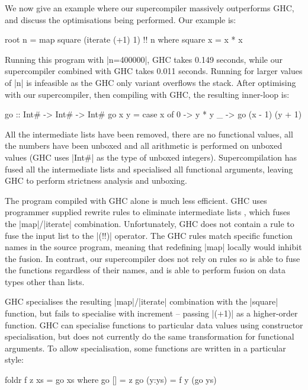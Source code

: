 \documentclass[draft]{sigplanconf}
\begin{document}
We now give an example where our supercompiler massively outperforms GHC, and discuss the optimisations being performed. Our example is:

\begin{code}
root n = map square (iterate (+1) 1) !! n
    where square x = x * x
\end{code}

Running this program with |n=400000|, GHC takes 0.149 seconds, while our supercompiler combined with GHC takes 0.011 seconds. Running for larger values of |n| is infeasible as the GHC only variant overflows the stack. After optimising with our supercompiler, then compiling with GHC, the resulting inner-loop is:

\begin{code}
go :: Int# -> Int# -> Int#
go x y = case x of
    0 -> y * y
    _ -> go (x - 1) (y + 1)
\end{code}

All the intermediate lists have been removed, there are no functional values, all the numbers have been unboxed and all arithmetic is performed on unboxed values (GHC uses |Int#| as the type of unboxed integers). Supercompilation has fused all the intermediate lists and specialised all functional arguments, leaving GHC to perform strictness analysis and unboxing.

The program compiled with GHC alone is much less efficient. GHC uses programmer supplied rewrite rules to eliminate intermediate lists \cite{spj:rules}, which fuses the |map|/|iterate| combination. Unfortunately, GHC does not contain a rule to fuse the input list to the |(!!)| operator. The GHC rules match specific function names in the source program, meaning that redefining |map| locally would inhibit the fusion. In contrast, our supercompiler does not rely on rules so is able to fuse the functions regardless of their names, and is able to perform fusion on data types other than lists.

GHC specialises the resulting |map|/|iterate| combination with the |square| function, but fails to specialise with increment -- passing |(+1)| as a higher-order function. GHC can specialise functions to particular data values using constructor specialisation, but does not currently do the same transformation for functional arguments. To allow specialisation, some functions are written in a particular style:

\begin{code}
foldr f z xs = go xs
    where  go []      = z
           go (y:ys)  = f y (go ys)
\end{code}
\end{document}
